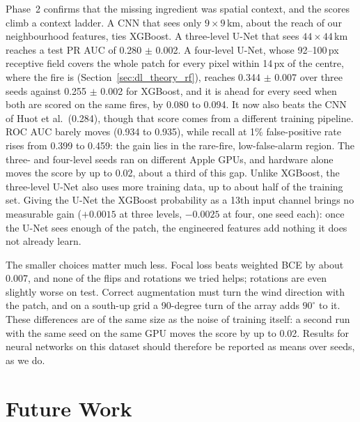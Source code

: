 Phase~2 confirms that the missing ingredient was spatial context, and the scores climb a context
ladder. A CNN that sees only $9\times9$\,km, about the reach of our neighbourhood features, ties XGBoost.
A three-level U-Net that sees $44\times44$\,km reaches a test PR AUC of 0.280 $\pm$ 0.002. A four-level
U-Net, whose 92--100\,px receptive field covers the whole patch for every pixel within 14\,px of the
centre, where the fire is (Section~\ref{sec:dl_theory_rf}), reaches 0.344 $\pm$ 0.007 over three seeds against
0.255 $\pm$ 0.002 for XGBoost, and it is ahead for every seed when both are scored on the same fires, by 0.080 to 0.094. It now
also beats the CNN of Huot et al.\ (0.284), though that score comes from a different training pipeline.
ROC AUC barely moves (0.934 to 0.935), while recall at 1\% false-positive rate rises from 0.399 to 0.459:
the gain lies in the rare-fire, low-false-alarm region. The three- and four-level seeds ran on different
Apple GPUs, and hardware alone moves the score by up to 0.02, about a third of this gap. Unlike XGBoost,
the three-level U-Net also uses more training data, up to about half of the training set. Giving the
U-Net the XGBoost probability as a 13th input channel brings no measurable gain ($+0.0015$ at three
levels, $-0.0025$ at four, one seed each): once the U-Net sees enough of the patch, the engineered
features add nothing it does not already learn.

The smaller choices matter much less. Focal loss beats weighted BCE by about 0.007, and none of the flips
and rotations we tried helps; rotations are even slightly worse on test. Correct augmentation must turn
the wind direction with the patch, and on a south-up grid a 90-degree turn of the array adds $90^\circ$ to
it. These differences are of the same size as the noise of training itself: a second run with the same
seed on the same GPU moves the score by up to 0.02. Results for neural networks on this dataset should
therefore be reported as means over seeds, as we do.

\section{Future Work}
\label{sec:future}

